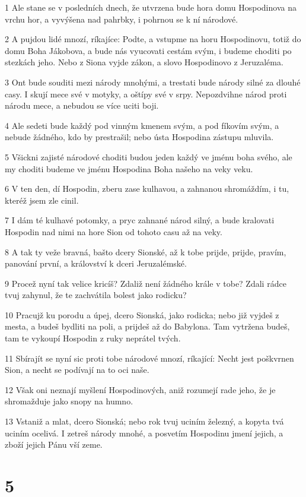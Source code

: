\par 1 Ale stane se v posledních dnech, že utvrzena bude hora domu Hospodinova na vrchu hor, a vyvýšena nad pahrbky, i pohrnou se k ní národové.
\par 2 A pujdou lidé mnozí, ríkajíce: Podte, a vstupme na horu Hospodinovu, totiž do domu Boha Jákobova, a bude nás vyucovati cestám svým, i budeme choditi po stezkách jeho. Nebo z Siona vyjde zákon, a slovo Hospodinovo z Jeruzaléma.
\par 3 Ont bude souditi mezi národy mnohými, a trestati bude národy silné za dlouhé casy. I skují mece své v motyky, a oštípy své v srpy. Nepozdvihne národ proti národu mece, a nebudou se více uciti boji.
\par 4 Ale sedeti bude každý pod vinným kmenem svým, a pod fíkovím svým, a nebude žádného, kdo by prestrašil; nebo ústa Hospodina zástupu mluvila.
\par 5 Všickni zajisté národové choditi budou jeden každý ve jménu boha svého, ale my choditi budeme ve jménu Hospodina Boha našeho na veky veku.
\par 6 V ten den, dí Hospodin, zberu zase kulhavou, a zahnanou shromáždím, i tu, kteréž jsem zle cinil.
\par 7 I dám té kulhavé potomky, a pryc zahnané národ silný, a bude kralovati Hospodin nad nimi na hore Sion od tohoto casu až na veky.
\par 8 A tak ty veže bravná, bašto dcery Sionské, až k tobe prijde, prijde, pravím, panování první, a království k dceri Jeruzalémské.
\par 9 Procež nyní tak velice kricíš? Zdaliž není žádného krále v tobe? Zdali rádce tvuj zahynul, že te zachvátila bolest jako rodicku?
\par 10 Pracujž ku porodu a úpej, dcero Sionská, jako rodicka; nebo již vyjdeš z mesta, a budeš bydliti na poli, a prijdeš až do Babylona. Tam vytržena budeš, tam te vykoupí Hospodin z ruky neprátel tvých.
\par 11 Sbírajít se nyní sic proti tobe národové mnozí, ríkající: Necht jest poškvrnen Sion, a necht se podívají na to oci naše.
\par 12 Však oni neznají myšlení Hospodinových, aniž rozumejí rade jeho, že je shromažduje jako snopy na humno.
\par 13 Vstaniž a mlat, dcero Sionská; nebo rok tvuj uciním železný, a kopyta tvá uciním ocelivá. I zetreš národy mnohé, a posvetím Hospodinu jmení jejich, a zboží jejich Pánu vší zeme.

\chapter{5}

